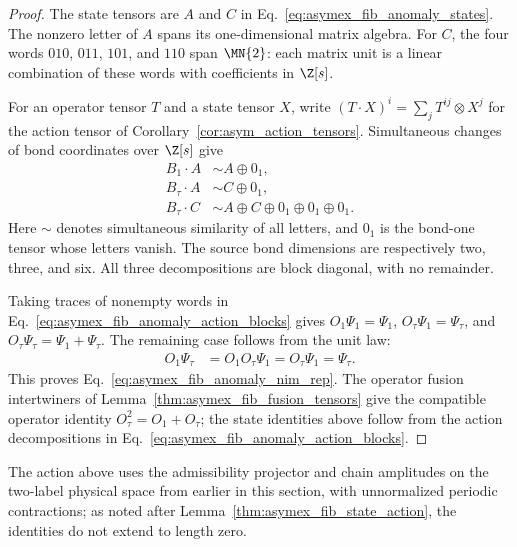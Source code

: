 \begin{proof}
    \leanok
    The state tensors are $A$ and $C$ in
    Eq.~\ref{eq:asymex_fib_anomaly_states}. The nonzero letter of $A$
    spans its one-dimensional matrix algebra. For $C$, the four words
    $010$, $011$, $101$, and $110$ span $\MN{2}$: each matrix unit is
    a linear combination of these words with coefficients in $\Z[s]$.

    For an operator tensor $T$ and a state tensor $X$, write
    $(T\cdot X)^i=\sum_jT^{ij}\otimes X^j$ for the action tensor of
    Corollary~\ref{cor:asym_action_tensors}. Simultaneous changes of bond
    coordinates over $\Z[s]$ give
    \begin{align}
        B_1\cdot A    & \sim A\oplus 0_1, \nonumber                   \\
        B_\tau\cdot A & \sim C\oplus 0_1, \nonumber                   \\
        B_\tau\cdot C & \sim A\oplus C\oplus 0_1\oplus 0_1\oplus 0_1.
        \label{eq:asymex_fib_anomaly_action_blocks}
    \end{align}
    Here $\sim$ denotes simultaneous similarity of all letters, and
    $0_1$ is the bond-one tensor whose letters vanish. The source bond
    dimensions are respectively two, three, and six. All three
    decompositions are block diagonal, with no remainder.

    Taking traces of nonempty words in
    Eq.~\ref{eq:asymex_fib_anomaly_action_blocks} gives
    $O_1\Psi_1=\Psi_1$, $O_\tau\Psi_1=\Psi_\tau$, and
    $O_\tau\Psi_\tau=\Psi_1+\Psi_\tau$. The remaining case follows from
    the unit law:
    \begin{align}
        O_1\Psi_\tau
         & =O_1O_\tau\Psi_1=O_\tau\Psi_1=\Psi_\tau.
    \end{align}
    This proves Eq.~\ref{eq:asymex_fib_anomaly_nim_rep}.
    The operator fusion intertwiners of
    Lemma~\ref{thm:asymex_fib_fusion_tensors} give the compatible
    operator identity $O_\tau^2=O_1+O_\tau$; the state identities above
    follow from the action decompositions in
    Eq.~\ref{eq:asymex_fib_anomaly_action_blocks}.
\end{proof}

The action above uses the admissibility projector and chain amplitudes on the
two-label physical space from earlier in this section, with unnormalized
periodic contractions; as noted after Lemma~\ref{thm:asymex_fib_state_action},
the identities do not extend to length zero.

